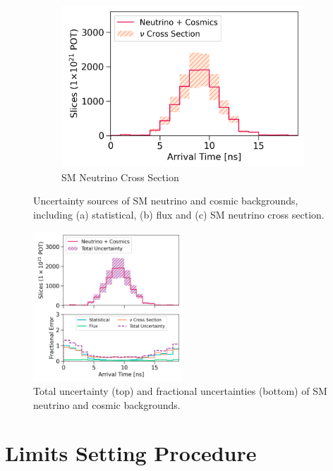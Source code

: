 \begin{figure}[htbp!]
\begin{subfigure}[b]{0.495\textwidth}
            \includegraphics[width=\textwidth]{bkg_xsec_error}
            \caption{SM Neutrino Cross Section}%
            \label{fig:bkg_xsec}
        \end{subfigure}
        \caption{
	Uncertainty sources of SM neutrino and cosmic backgrounds, including (a) statistical, (b) flux and (c) SM neutrino cross section.
	}
        \label{fig:bkg_error}
	\vspace{0.5cm}
\centering    
\includegraphics[width=0.5\textwidth]{bkg_error}
\caption[bkg error]{
Total uncertainty (top) and fractional uncertainties (bottom) of SM neutrino and cosmic backgrounds.
}
\label{fig:bkg_total_error}
\end{figure}

\section{Limits Setting Procedure}
\label{sec:limit_procedure}

